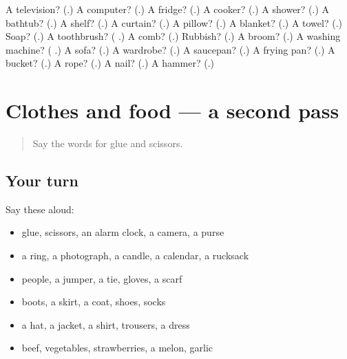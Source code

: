 \begin{tcolorbox}[breakable,colback=teal!4,colframe=teal!35!black,title={Before you move on}]
A television? (\textbf{}.) A computer? (\textbf{}.) A fridge? (\textbf{}.) A cooker? (\textbf{}.) A shower? (\textbf{}.) A bathtub? (\textbf{}.) A shelf? (\textbf{}.) A curtain? (\textbf{}.) A pillow? (\textbf{}.) A blanket? (\textbf{}.) A towel? (\textbf{}.) Soap? (\textbf{}.) A toothbrush? (\textbf{ }.) A comb? (\textbf{}.) Rubbish? (\textbf{}.) A broom? (\textbf{}.) A washing machine? (\textbf{ }.) A sofa? (\textbf{}.) A wardrobe? (\textbf{}.) A saucepan? (\textbf{}.) A frying pan? (\textbf{}.) A bucket? (\textbf{}.) A rope? (\textbf{}.) A nail? (\textbf{}.) A hammer? (\textbf{}.)
\end{tcolorbox}
\section[(dialogue)]{Clothes and food — a second pass}

\label{lesson:RU-R104-second-pass-clothes-and-food}



\begin{quote}
Say the words for glue and scissors.
\end{quote}

\subsection*{Your turn}
Say these aloud:

\begin{itemize}
\raggedright
  \item glue, scissors, an alarm clock, a camera, a purse
  \item a ring, a photograph, a candle, a calendar, a rucksack
  \item people, a jumper, a tie, gloves, a scarf
  \item boots, a skirt, a coat, shoes, socks
  \item a hat, a jacket, a shirt, trousers, a dress
  \item beef, vegetables, strawberries, a melon, garlic
\end{itemize}

